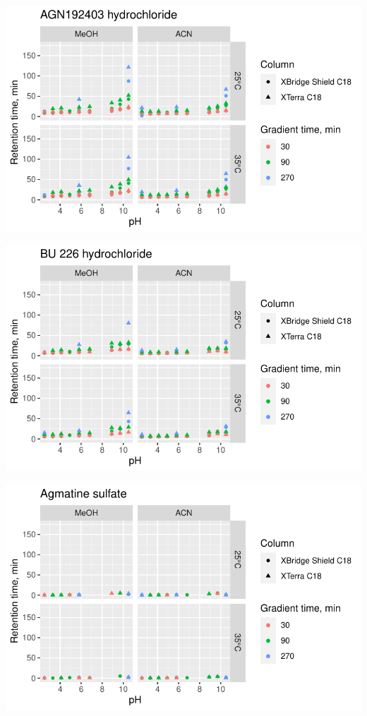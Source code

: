 \documentclass[
  letterpaper,
  DIV=11,
  numbers=noendperiod]{scrreprt}
\begin{document}
\includegraphics{index_files/figure-pdf/unnamed-chunk-4-96.pdf}

\includegraphics{index_files/figure-pdf/unnamed-chunk-4-97.pdf}

\includegraphics{index_files/figure-pdf/unnamed-chunk-4-98.pdf}
\end{document}
